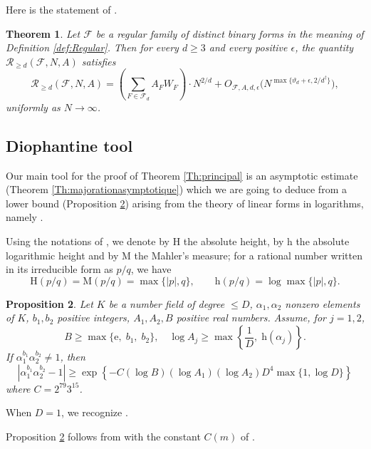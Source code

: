 \documentclass[10pt]{article}
\newtheorem{theorem}{Theorem}[section]
\newtheorem{proposition}[theorem]{Proposition}
\theoremstyle{definition}
\numberwithin{equation}{section}
\newcommand{\rmh}{\mathrm {h}}
\newcommand{\rmH}{\mathrm {H}}
\newcommand{\rmM}{\mathrm {M}}
\newcommand{\rme}{\mathrm {e}}
\newcommand{\calF}{\mathcal {F}}
\newcommand{\calR}{\mathcal {R}}
\begin{document}
Here is the statement of \cite[Theorem 2.6]{FW2}.

\begin{theorem}\label{Th:VFW2th1.6}
Let $\calF$ be a regular family of distinct binary forms in the meaning of Definition \ref{def:Regular}. 
 Then for every $d\geqslant 3$ and every positive $\epsilon$, the quantity
 $
 {\calR}_{\geqslant d} \left (\calF, N, A\right)$ satisfies
\[
\calR_{\geqslant d} (\calF, N, A) = \left( \sum_{F\in \calF_d} A_F W_F \right) \cdot N^{2/d} + 
O_{\calF,A,d, \epsilon}\bigl( N^{\max\{ \vartheta_d+\epsilon, 2/d^\dag\} }\bigr), 
\]
uniformly as $N \to\infty$.
\end{theorem}
 
 
 
 \subsection{Diophantine tool}%

Our main tool for the proof of Theorem \ref{Th:principal} is an asymptotic estimate (Theorem \ref{Th:majorationasymptotique}) which we are going to deduce from a lower bound (Proposition \ref{Prop:9.22}) arising from the theory of linear forms in logarithms, namely \cite[Corollary 9.22]{W}. 

Using the notations of \cite[\S 5]{FW2}, we denote by $\rmH$ the absolute height, by $\rmh$ the absolute logarithmic height and by $\rmM$ the Mahler's measure; for a rational number written in its irreducible form as $p/q$, we have
\[
\rmH(p/q)=\rmM(p/q)=\max\{|p|,q\}, \qquad
\rmh(p/q)= \log\max\{|p|,q\}.
\] 

\medskip
\begin{proposition} \label{Prop:9.22}
Let $K$ be a number field of degree $\leqslant D$, $\alpha_1, \alpha_2$ nonzero elements of $K$, $b_1,b_2$ positive integers, $A_1,A_2,B$ positive real numbers. Assume, for $j=1,2$, 
\[
B\geqslant \max \{\rme,\; b_1,\; b_2\},
\quad 
\log A_j\geqslant \max\left\{\frac 1 D,\; \rmh(\alpha_j)\right\}.
\]
If $ \alpha_1^{b_1}\alpha_2^{b_2}\not=1$, then 
\[ 
|\alpha_1^{b_1}\alpha_2^{b_2}-1|\geqslant \exp
\left\{ 
-C(\log B)(\log A_1)(\log A_2)D^4 \max\{1,\log D\}
\right\}
\] 
where $C=2^{79}3^{15}$. 
\end{proposition}

\medskip
When $D=1$, we recognize \cite[Proposition 5.1]{FW2}.

Proposition \ref{Prop:9.22} follows from \cite[Corollary 9.22 p. 308]{W} with the constant $C(m)$ of \cite[p. 252]{W}.
\end{document}
